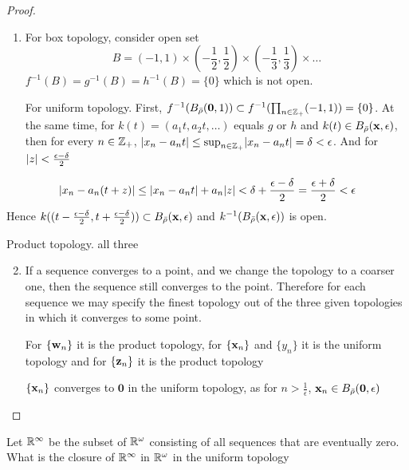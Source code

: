 \documentclass[11pt]{article}
\begin{document}
\begin{proof}
\begin{enumerate}
\item For box topology, consider open set
\begin{equation*}
B=(-1,1)\times(-\frac{1}{2},\frac{1}{2})\times(-\frac{1}{3},\frac{1}{3})\times\dots
\end{equation*}
\(f^{-1}(B)=g^{-1}(B)=h^{-1}(B)=\{0\}\) which is not open.

For uniform topology. First, \(f^{-1}(B_{\bar{\rho}}(\textbf{0},1))\subset f^{-1}(\prod_{n\in\mathbb{Z}_+}(-1,1))=\{0\}\). At the
same time, for \(k(t)=(a_1t,a_2t,\dots)\) equals \(g\) or \(h\)
and \(k(t)\in B_{\bar{\rho}}(\operatorname{\textbf{x}},\epsilon)\), then for
every \(n\in\mathbb{Z}_+\),  \(\abs{x_n-a_nt}\le\sup_{n\in\Z_+}\abs{x_n-a_nt}=\delta<\epsilon\).
And
for \(\abs{z}<\frac{\epsilon-\delta}{2}\)
\end{enumerate}
\begin{equation*}
\abs{x_n-a_n(t+z)}\le\abs{x_n-a_nt}+a_n\abs{z}<\delta+\frac{\epsilon-\delta}{2}=\frac{\epsilon+\delta}{2}<\epsilon
\end{equation*}
Hence \(k((t-\frac{\epsilon-\delta}{2},t+\frac{\epsilon-\delta}{2}))\subset B_{\bar{\rho}}(\operatorname{\textbf{x}},\epsilon)\) and \(k^{-1}(B_{\bar{\rho}}(\operatorname{\textbf{x}},\epsilon))\)
is open.

Product topology. all three
\begin{enumerate}
\setcounter{enumi}{1}
\item If a sequence converges to a point, and we change the topology to a coarser one, then
the sequence still converges to the point. Therefore for each sequence we may specify the
finest topology out of the three given topologies in which it converges to some point.

For \(\{\operatorname{\textbf{w}}_n\}\) it is the product topology, for  \(\{\operatorname{\textbf{x}}_n\}\) and \(\{y_n\}\)  it is the uniform
topology and for \(\{\operatorname{\textbf{z}}_n\}\) it is the product topology

\(\{\operatorname{\textbf{x}}_n\}\) converges to \(\textbf{0}\) in the uniform topology, as
for \(n>\frac{1}{\epsilon}\), \(\operatorname{\textbf{x}}_n\in B_{\bar{\rho}}(\textbf{0},\epsilon)\)
\end{enumerate}
\end{proof}

\begin{exercise}
\label{ex20.5}
Let \(\mathbb{R}^\infty\) be the subset of \(\mathbb{R}^\omega\) consisting of all sequences that are eventually zero. What
is the closure of \(\mathbb{R}^\infty\) in \(\mathbb{R}^\omega\) in the uniform topology
\end{exercise}
\end{document}
